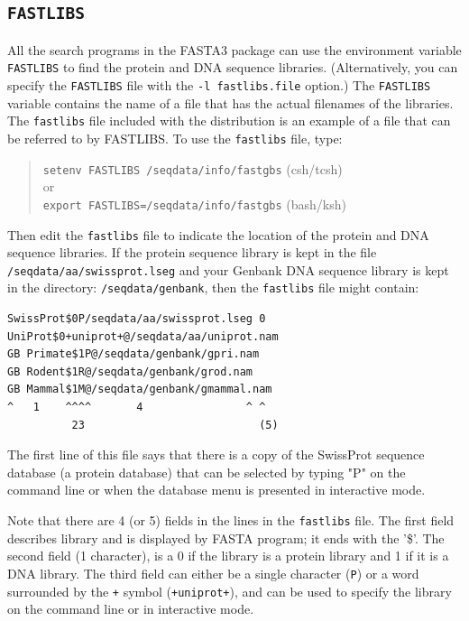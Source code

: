 \documentclass[11pt]{article}
\begin{document}
\subsection{\texttt{FASTLIBS}}
\label{fastlibs}

All the search programs in the FASTA3 package can use the environment
variable \texttt{FASTLIBS} to find the protein and DNA sequence
libraries. (Alternatively, you can specify the \texttt{FASTLIBS} file
with the \texttt{-l fastlibs.file} option.) The \texttt{FASTLIBS}
variable contains the name of a file that has the actual filenames of
the libraries.  The \texttt{fastlibs} file included with the
distribution is an example of a file that can be referred to by
FASTLIBS. To use the \texttt{fastlibs} file, type:
\begin{quote}
\texttt{setenv FASTLIBS /seqdata/info/fastgbs} (csh/tcsh)\\
 or\\
\texttt{export FASTLIBS=/seqdata/info/fastgbs} (bash/ksh)
\end{quote}
 Then edit the \texttt{fastlibs} file to indicate the location of the
 protein and DNA sequence libraries.  If the protein sequence library is
 kept in the file \texttt{/seqdata/aa/swissprot.lseg} and your Genbank
 DNA sequence library is kept in the directory:
 \texttt{/seqdata/genbank}, then the \texttt{fastlibs} file might
 contain:
\begin{verbatim}
SwissProt$0P/seqdata/aa/swissprot.lseg 0
UniProt$0+uniprot+@/seqdata/aa/uniprot.nam
GB Primate$1P@/seqdata/genbank/gpri.nam
GB Rodent$1R@/seqdata/genbank/grod.nam 
GB Mammal$1M@/seqdata/genbank/gmammal.nam
^   1    ^^^^       4                ^ ^
          23                           (5)
\end{verbatim}
The first line of this file says that there is a copy of the SwissProt
sequence database (a protein database) that can be selected by typing
"P" on the command line or when the database menu is presented in
interactive mode.

Note that there are 4 (or 5) fields in the lines in the
\texttt{fastlibs} file.  The first field describes library and is
displayed by FASTA program; it ends with the '\$'.  The second field
(1 character), is a 0 if the library is a protein library and 1 if it
is a DNA library.  The third field can either be a single character
(\texttt{P}) or a word surrounded by the \texttt{+} symbol
(\texttt{+uniprot+}), and can be used to specify the library on the command line or in interactive mode.
\end{document}
